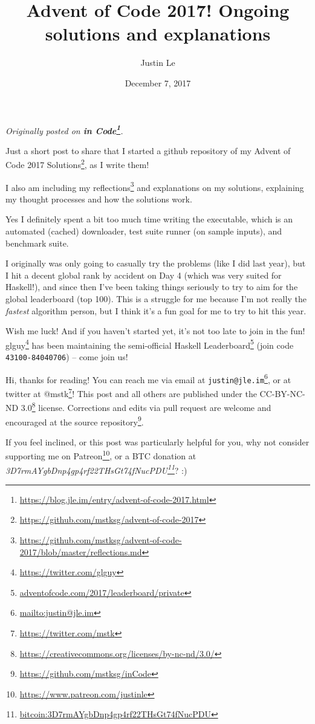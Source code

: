 \documentclass[]{article}
\title{Advent of Code 2017! Ongoing solutions and explanations}
\author{Justin Le}
\date{December 7, 2017}
\renewcommand{\href}[2]{#2\footnote{\url{#1}}}
\begin{document}
\maketitle

\emph{Originally posted on
\textbf{\href{https://blog.jle.im/entry/advent-of-code-2017.html}{in Code}}.}

Just a short post to share that I started a github repository of my
\href{https://github.com/mstksg/advent-of-code-2017}{Advent of Code 2017
Solutions}, as I write them!

I also am including my
\href{https://github.com/mstksg/advent-of-code-2017/blob/master/reflections.md}{reflections}
and explanations on my solutions, explaining my thought processes and how the
solutions work.

Yes I definitely spent a bit too much time writing the executable, which is an
automated (cached) downloader, test suite runner (on sample inputs), and
benchmark suite.

I originally was only going to casually try the problems (like I did last year),
but I hit a decent global rank by accident on Day 4 (which was very suited for
Haskell!), and since then I've been taking things seriously to try to aim for
the global leaderboard (top 100). This is a struggle for me because I'm not
really the \emph{fastest} algorithm person, but I think it's a fun goal for me
to try to hit this year.

Wish me luck! And if you haven't started yet, it's not too late to join in the
fun! \href{https://twitter.com/glguy}{glguy} has been maintaining the
semi-official \href{adventofcode.com/2017/leaderboard/private}{Haskell
Leaderboard} (join code \texttt{43100-84040706}) -- come join us!

Hi, thanks for reading! You can reach me via email at
\href{mailto:justin@jle.im}{\nolinkurl{justin@jle.im}}, or at twitter at
\href{https://twitter.com/mstk}{@mstk}! This post and all others are published
under the \href{https://creativecommons.org/licenses/by-nc-nd/3.0/}{CC-BY-NC-ND
3.0} license. Corrections and edits via pull request are welcome and encouraged
at \href{https://github.com/mstksg/inCode}{the source repository}.

If you feel inclined, or this post was particularly helpful for you, why not
consider \href{https://www.patreon.com/justinle}{supporting me on Patreon}, or a
BTC donation at
\emph{\href{bitcoin:3D7rmAYgbDnp4gp4rf22THsGt74fNucPDU}{3D7rmAYgbDnp4gp4rf22THsGt74fNucPDU}}?
:)
\end{document}

